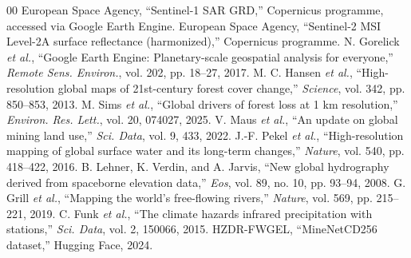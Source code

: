\documentclass[conference]{IEEEtran}
\begin{document}
\begin{thebibliography}{00}
 European Space Agency, ``Sentinel-1 SAR GRD,'' Copernicus programme, accessed via Google Earth Engine.
 European Space Agency, ``Sentinel-2 MSI Level-2A surface reflectance (harmonized),'' Copernicus programme.
 N. Gorelick \emph{et al.}, ``Google Earth Engine: Planetary-scale geospatial analysis for everyone,'' \emph{Remote Sens. Environ.}, vol. 202, pp. 18--27, 2017.
 M. C. Hansen \emph{et al.}, ``High-resolution global maps of 21st-century forest cover change,'' \emph{Science}, vol. 342, pp. 850--853, 2013.
 M. Sims \emph{et al.}, ``Global drivers of forest loss at 1 km resolution,'' \emph{Environ. Res. Lett.}, vol. 20, 074027, 2025.
 V. Maus \emph{et al.}, ``An update on global mining land use,'' \emph{Sci. Data}, vol. 9, 433, 2022.
 J.-F. Pekel \emph{et al.}, ``High-resolution mapping of global surface water and its long-term changes,'' \emph{Nature}, vol. 540, pp. 418--422, 2016.
 B. Lehner, K. Verdin, and A. Jarvis, ``New global hydrography derived from spaceborne elevation data,'' \emph{Eos}, vol. 89, no. 10, pp. 93--94, 2008.
 G. Grill \emph{et al.}, ``Mapping the world's free-flowing rivers,'' \emph{Nature}, vol. 569, pp. 215--221, 2019.
 C. Funk \emph{et al.}, ``The climate hazards infrared precipitation with stations,'' \emph{Sci. Data}, vol. 2, 150066, 2015.
 HZDR-FWGEL, ``MineNetCD256 dataset,'' Hugging Face, 2024.
\end{thebibliography}
\end{document}
